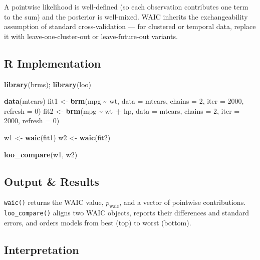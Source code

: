 \documentclass[
]{article}
\newenvironment{Shaded}{\begin{snugshade}}{\end{snugshade}}
\newcommand{\AttributeTok}[1]{\textcolor[rgb]{0.13,0.29,0.53}{#1}}
\newcommand{\DecValTok}[1]{\textcolor[rgb]{0.00,0.00,0.81}{#1}}
\newcommand{\FunctionTok}[1]{\textcolor[rgb]{0.13,0.29,0.53}{\textbf{#1}}}
\newcommand{\NormalTok}[1]{#1}
\newcommand{\OtherTok}[1]{\textcolor[rgb]{0.56,0.35,0.01}{#1}}
\newcommand{\SpecialCharTok}[1]{\textcolor[rgb]{0.81,0.36,0.00}{\textbf{#1}}}
\begin{document}
A pointwise likelihood is well-defined (so each observation contributes
one term to the sum) and the posterior is well-mixed. WAIC inherits the
exchangeability assumption of standard cross-validation --- for
clustered or temporal data, replace it with leave-one-cluster-out or
leave-future-out variants.

\subsection{R Implementation}\label{r-implementation}

\begin{Shaded}
\begin{Highlighting}[]
\FunctionTok{library}\NormalTok{(brms); }\FunctionTok{library}\NormalTok{(loo)}

\FunctionTok{data}\NormalTok{(mtcars)}
\NormalTok{fit1 }\OtherTok{\textless{}{-}} \FunctionTok{brm}\NormalTok{(mpg }\SpecialCharTok{\textasciitilde{}}\NormalTok{ wt, }\AttributeTok{data =}\NormalTok{ mtcars, }\AttributeTok{chains =} \DecValTok{2}\NormalTok{, }\AttributeTok{iter =} \DecValTok{2000}\NormalTok{, }\AttributeTok{refresh =} \DecValTok{0}\NormalTok{)}
\NormalTok{fit2 }\OtherTok{\textless{}{-}} \FunctionTok{brm}\NormalTok{(mpg }\SpecialCharTok{\textasciitilde{}}\NormalTok{ wt }\SpecialCharTok{+}\NormalTok{ hp, }\AttributeTok{data =}\NormalTok{ mtcars, }\AttributeTok{chains =} \DecValTok{2}\NormalTok{, }\AttributeTok{iter =} \DecValTok{2000}\NormalTok{, }\AttributeTok{refresh =} \DecValTok{0}\NormalTok{)}

\NormalTok{w1 }\OtherTok{\textless{}{-}} \FunctionTok{waic}\NormalTok{(fit1)}
\NormalTok{w2 }\OtherTok{\textless{}{-}} \FunctionTok{waic}\NormalTok{(fit2)}

\FunctionTok{loo\_compare}\NormalTok{(w1, w2)}
\end{Highlighting}
\end{Shaded}

\subsection{Output \& Results}\label{output-results}

\texttt{waic()} returns the WAIC value, \(p_{\text{waic}}\), and a
vector of pointwise contributions. \texttt{loo\_compare()} aligns two
WAIC objects, reports their differences and standard errors, and orders
models from best (top) to worst (bottom).

\subsection{Interpretation}\label{interpretation}
\end{document}
